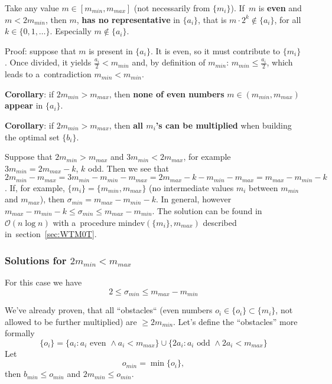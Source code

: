 \documentclass[paper=a4,parskip=half,DIV=12]{leetcode}
\begin{document}
Take any value $m \in [m_{min}, m_{max}]$ (not necessarily from $\{m_i\}$).
If~$m$ is \textbf{even} and $m < 2 m_{min}$, then $m$, \textbf{has no
representative} in $\{a_i\}$, that is $m\cdot 2^k \notin \{a_i\}$, for all $k
\in \{ 0,1,\dots \}$. Especially $m \notin \{a_i\}$.

Proof: suppose that $m$ is present in $\{a_i\}$. It is even, so it must
contribute to $\{m_i\}$. Once divided, it yields $\frac{a_i}{2} < m_{min}$ and,
by definition of $m_{min}$: $m_{min} \le \frac{a_i}{2}$, which leads to
a~contradiction $m_{min} < m_{min}$.

\textbf{Corollary}: if $2 m_{min} > m_{max}$, then \textbf{none of even
numbers} $m \in (m_{min}, m_{max})$ \textbf{appear} in $\{a_i\}$.

\textbf{Corollary}: if $2 m_{min} > m_{max}$, then \textbf{all $m_i$'s can be
multiplied} when building the optimal set $\{b_i\}$.

Suppose that $2 m_{min} > m_{max}$ and $3 m_{min} < 2 m_{max}$, for example
$3 m_{min} = 2 m_{max} - k$, $k$ odd. Then we see that $2 m_{min} - m_{max} =
3 m_{min} - m_{min} - m_{max} = 2 m_{max} - k - m_{min} - m_{max} = m_{max} - m_{min} - k$.
If, for example, $\{ m_i \} = \{ m_{min}, m_{max} \}$ (no intermediate values
$m_i$ between $m_{min}$ and $m_{max}$), then $\sigma_{min} = m_{max} - m_{min} - k$.
In general, however $m_{max} - m_{min} - k \le \sigma_{min} \le m_{max} -
m_{min}$. The solution can be found in $\mathcal{O}(n \log{n})$ with
a~procedure $\mathrm{mindev}(\{ m_i \}, m_{max})$ described
in~section~\ref{sec:WTM0T}.

\subsubsection{Solutions for $2 m_{min} < m_{max}$}
\label{sec:2SBRZ}

For this case we have
\begin{equation}
  2 \le \sigma_{min} \le m_{max} - m_{min}
  \label{eq:0Y3X2}
\end{equation}

We've already proven, that all ``obstacles`` (even numbers $o_i \in \{ o_i \}
\subset \{ m_i \}$, not allowed to be further multiplied) are $ \ge2 m_{min}$.
Let's define the ``obstacles'' more formally
\begin{equation}
  \{ o_i \} = \{ a_i: a_i \text{ even } \wedge a_i < m_{max} \} \cup
              \{ 2 a_i: a_i \text{ odd } \wedge  2 a_i < m_{max} \}
  \label{eq:SDKKJ}
\end{equation}
Let
\begin{equation}
  o_{min} = \min \{o_i\},
  \label{eq:T13ET}
\end{equation}
then $b_{min} \le o_{min}$ and $2 m_{min} \le o_{min}$.
\end{document}
